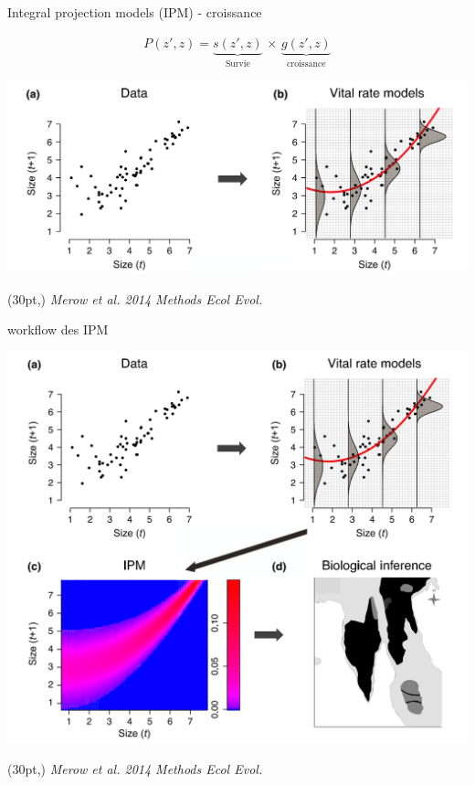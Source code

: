 \documentclass[11pt, compress, aspectratio=1610]{beamer}
\newcommand\smallcitation[1]{%
\begin{textblock*}{\textwidth}(30pt,\textheight)
	\raggedleft \footnotesize\textit{#1}
\end{textblock*}}
\begin{document}
\begin{frame}{Integral projection models (IPM) - croissance}

\begin{align*}
  P(z', z) = \underbrace{s(z', z)}_\text{Survie} \,\times \, \underbrace{g(z', z)}_\text{croissance}
\end{align*}

\centering
 \includegraphics[scale=0.40]{figures/Merow2014a.png}\par

\smallcitation{Merow et al. 2014 Methods Ecol Evol.}

\end{frame}

\begin{frame}{workflow des IPM}

\centering
 \includegraphics[scale=0.325]{figures/Merow2014.png}\par

\smallcitation{Merow et al. 2014 Methods Ecol Evol.}

\end{frame}
\end{document}
